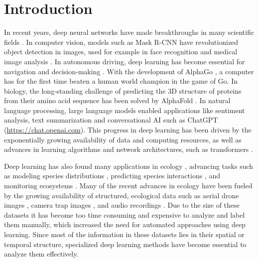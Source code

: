 \documentclass[12pt,twoside]{scrreport}
\begin{document}
\chapter*{Introduction}
\setcounter{page}{1}
In recent years, deep neural networks have made breakthroughs in many scientific fields \citep{jordanMachineLearningTrends2015}. In computer vision, models such as Mask R-CNN \citep{heMaskRCNN2017} have revolutionized object detection in images, used for example in face recognition \citep{wangDeepFaceRecognition2021} and medical image analysis \citep{litjensSurveyDeepLearning2017}. In autonomous driving, deep learning has become essential for navigation and decision-making \citep{bojarskiEndEndLearning2016}. With the development of AlphaGo \citep{silver2016mastering}, a computer has for the first time beaten a human world champion in the game of Go. In biology, the long-standing challenge of predicting the 3D structure of proteins from their amino acid sequence has been solved by AlphaFold \citep{jumperHighlyAccurateProtein2021}. In natural language processing, large language models \citep[e.g., GPT-3,][]{brownLanguageModelsAre2020} enabled applications like sentiment analysis, text summarization and conversational AI such as ChatGPT (\url{https://chat.openai.com}). This progress in deep learning has been driven by the exponentially growing availability of data and computing resources, as well as advances in learning algorithms and network architectures, such as transformers \citep{vaswaniAttentionAllYou2017}.

Deep learning has also found many applications in ecology \citep{pichlerMachineLearningDeep2023, borowiecDeepLearningTool2022, tuiaPerspectivesMachineLearning2022, christinApplicationsDeepLearning2019}, advancing tasks such as modeling species distributions \citep[e.g.,][]{botella2018deep}, predicting species interactions \citep[e.g.,][]{pichlerMachineLearningAlgorithms2020}, and monitoring ecosystems \citep[e.g.,][]{macaodhaBatDetectiveDeep2018}. Many of the recent advances in ecology have been fueled by the growing availability of structured, ecological data such as aerial drone images \citep[e.g., ][]{kattenbornConvolutionalNeuralNetworks2019}, camera trap images \citep[e.g., ][]{norouzzadehAutomaticallyIdentifyingCounting2018}, and audio recordings \citep[e.g., ][]{9799968}. Due to the size of these datasets it has become too time consuming and expensive to analyze and label them manually, which increased the need for automated approaches using deep learning. Since most of the information in these datasets lies in their spatial or temporal structure, specialized deep learning methods have become essential to analyze them effectively.
\end{document}
